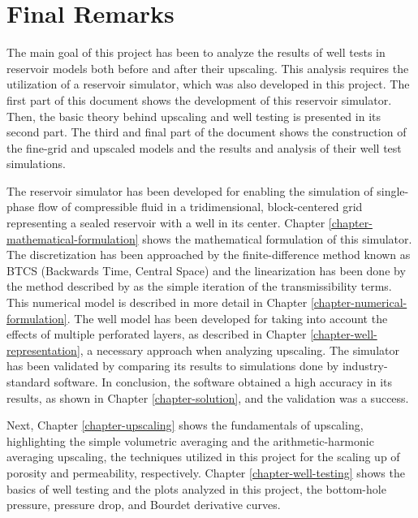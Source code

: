 \chapter{Final Remarks}

The main goal of this project has been to analyze the results of well tests in reservoir models both before and after their upscaling.
%
This analysis requires the utilization of a reservoir simulator, which was also developed in this project. 
%
The first part of this document shows the development of this reservoir simulator. 
%
Then, the basic theory behind upscaling and well testing is presented in its second part. 
%
The third and final part of the document shows the construction of the fine-grid and upscaled models and the results and analysis of their well test simulations.

The reservoir simulator has been developed for enabling the simulation of single-phase flow of compressible fluid in a tridimensional, block-centered grid representing a sealed reservoir with a well in its center. 
%
Chapter \ref{chapter-mathematical-formulation} shows the mathematical formulation of this simulator. 
%
The discretization has been approached by the finite-difference method known as BTCS (Backwards Time, Central Space) and the linearization has been done by the method described by \cite{Ertekin2001} as the simple iteration of the transmissibility terms. 
%
This numerical model is described in more detail in Chapter \ref{chapter-numerical-formulation}. 
%
The well model has been developed for taking into account the effects of multiple perforated layers, as described in Chapter \ref{chapter-well-representation}, a necessary approach when analyzing upscaling. 
%
The simulator has been validated by comparing its results to simulations done by industry-standard software. 
%
In conclusion, the software obtained a high accuracy in its results, as shown in Chapter \ref{chapter-solution}, and the validation was a success.

Next, Chapter \ref{chapter-upscaling} shows the fundamentals of upscaling, highlighting the simple volumetric averaging and the arithmetic-harmonic averaging upscaling, the techniques utilized in this project for the scaling up of porosity and permeability, respectively. 
%
Chapter \ref{chapter-well-testing} shows the basics of well testing and the plots analyzed in this project, the bottom-hole pressure, pressure drop, and Bourdet derivative curves.

